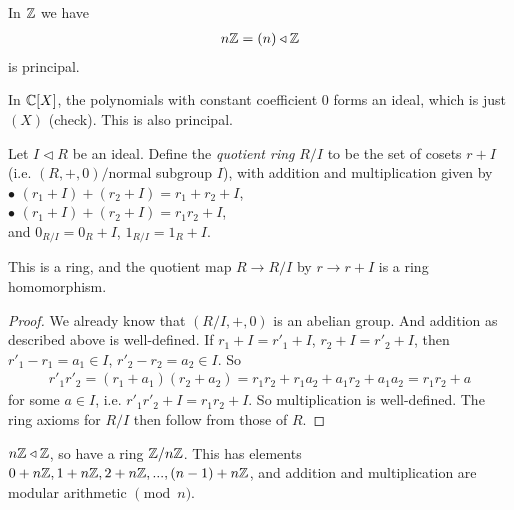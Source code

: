 \documentclass[a4paper]{article}
\begin{document}
\begin{eg}
In $\mathbb{Z}$ we have
\begin{equation*}
\begin{aligned}
n\mathbb{Z} = (n) \triangleleft \mathbb{Z}
\end{aligned}
\end{equation*}
is principal.
\end{eg}

\begin{eg}
In $\mathbb{C}[X]$, the polynomials with constant coefficient $0$ forms an ideal, which is just $(X)$ (check). This is also principal.
\end{eg}

\begin{prop}
Let $I \triangleleft R$ be an ideal. Define the \emph{quotient ring} $R/I$ to be the set of cosets $r+I$ (i.e. $(R,+,0)/$normal subgroup $I$), with addition and multiplication given by\\
$\bullet$ $(r_1+I)+(r_2+I) = r_1+r_2+I$,\\
$\bullet$ $(r_1+I)+(r_2+I) = r_1r_2 + I$,\\
and $0_{R/I} =0_R+I$, $1_{R/I} = 1_R+I$. 

This is a ring, and the quotient map $R \to R/I$ by $r \to r+I$ is a ring homomorphism.
\begin{proof}
We already know that $(R/I,+,0)$ is an abelian group. And addition as described above is well-defined. If $r_1+I=r'_1+I$, $r_2+I = r'_2+I$, then $r'_1-r_1 =a_1 \in I$, $r'_2-r_2 = a_2 \in I$. So
\begin{equation*}
\begin{aligned}
r'_1r'_2 = (r_1+a_1)(r_2+a_2)=r_1r_2+r_1a_2+a_1r_2+a_1a_2 = r_1r_2 + a
\end{aligned}
\end{equation*}
for some $a \in I$, i.e. $r'_1r'_2 + I = r_1 r_2 + I$. So multiplication is well-defined. The ring axioms for $R/I$ then follow from those of $R$.
\end{proof}
\end{prop}

\begin{eg}
$n\mathbb{Z} \triangleleft \mathbb{Z}$, so have a ring $\mathbb{Z}/n\mathbb{Z}$. This has elements $0+n\mathbb{Z},1+n\mathbb{Z},2+n\mathbb{Z},...,(n-1)+n\mathbb{Z}$, and addition and multiplication are modular arithmetic $\pmod n$.
\end{eg}
\end{document}

